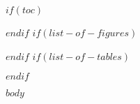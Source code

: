 \documentclass[$fontsize$,a4paper,oneside]{article}
\date{$date$}
\title{\myTitle}
\author{\myName}
\theoremstyle{definition}
\theoremstyle{plain}
\begin{document}
\pagestyle{headings}
\maketitle
$if(toc)$
\setcounter{tocdepth}{$toc-depth$}
\tableofcontents
\markboth{\contentsname}{\contentsname} 
$endif$
$if(list-of-figures)$ 
{}
\listoffigures
$endif$
$if(list-of-tables)$
{}
\listoftables
$endif$

\cleardoublepage
{}
$body$
\printbibliography
\end{document}
